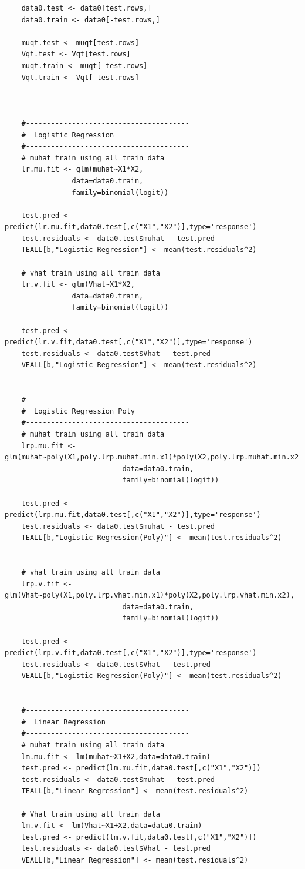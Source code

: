 \documentclass[twoside,12pt]{article}
\begin{document}
\begin{verbatim}
	data0.test <- data0[test.rows,]
	data0.train <- data0[-test.rows,]

	muqt.test <- muqt[test.rows]
	Vqt.test <- Vqt[test.rows]
	muqt.train <- muqt[-test.rows]
	Vqt.train <- Vqt[-test.rows]



	#---------------------------------------
	#  Logistic Regression
	#---------------------------------------
	# muhat train using all train data
	lr.mu.fit <- glm(muhat~X1*X2,
				data=data0.train,
				family=binomial(logit))

	test.pred <- predict(lr.mu.fit,data0.test[,c("X1","X2")],type='response')
	test.residuals <- data0.test$muhat - test.pred
	TEALL[b,"Logistic Regression"] <- mean(test.residuals^2)

	# vhat train using all train data
	lr.v.fit <- glm(Vhat~X1*X2,
				data=data0.train,
				family=binomial(logit))

	test.pred <- predict(lr.v.fit,data0.test[,c("X1","X2")],type='response')
	test.residuals <- data0.test$Vhat - test.pred
	VEALL[b,"Logistic Regression"] <- mean(test.residuals^2)


	#---------------------------------------
	#  Logistic Regression Poly
	#---------------------------------------
	# muhat train using all train data
	lrp.mu.fit <- glm(muhat~poly(X1,poly.lrp.muhat.min.x1)*poly(X2,poly.lrp.muhat.min.x2),
							data=data0.train,
							family=binomial(logit))

	test.pred <- predict(lrp.mu.fit,data0.test[,c("X1","X2")],type='response')
	test.residuals <- data0.test$muhat - test.pred
	TEALL[b,"Logistic Regression(Poly)"] <- mean(test.residuals^2)


	# vhat train using all train data
	lrp.v.fit <- glm(Vhat~poly(X1,poly.lrp.vhat.min.x1)*poly(X2,poly.lrp.vhat.min.x2),
							data=data0.train,
							family=binomial(logit))

	test.pred <- predict(lrp.v.fit,data0.test[,c("X1","X2")],type='response')
	test.residuals <- data0.test$Vhat - test.pred
	VEALL[b,"Logistic Regression(Poly)"] <- mean(test.residuals^2)


	#---------------------------------------
	#  Linear Regression 
	#---------------------------------------
	# muhat train using all train data
	lm.mu.fit <- lm(muhat~X1+X2,data=data0.train)
	test.pred <- predict(lm.mu.fit,data0.test[,c("X1","X2")])
	test.residuals <- data0.test$muhat - test.pred
	TEALL[b,"Linear Regression"] <- mean(test.residuals^2)

	# Vhat train using all train data
	lm.v.fit <- lm(Vhat~X1+X2,data=data0.train)
	test.pred <- predict(lm.v.fit,data0.test[,c("X1","X2")])
	test.residuals <- data0.test$Vhat - test.pred
	VEALL[b,"Linear Regression"] <- mean(test.residuals^2)




\end{verbatim}
\end{document}
